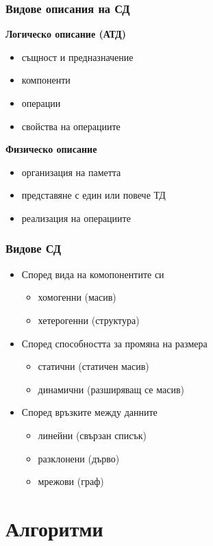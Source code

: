 \documentclass[alsotrans]{beamerswitch}
\begin{document}
\begin{frame}
  \frametitle{Видове описания на СД}

  \textbf{Логическо описание (АТД)}
  \begin{itemize}
  \item същност и предназначение
  \item компоненти
  \item операции
  \item свойства на операциите
  \end{itemize}
  \vspace{1em}
  \pause
  \textbf{Физическо описание}
  \begin{itemize}
  \item организация на паметта
  \item представяне с един или повече ТД
  \item реализация на операциите
  \end{itemize}
\end{frame}

\begin{frame}
  \frametitle{Видове СД}

  \begin{itemize}[<+->]
  \item Според вида на комопонентите си
    \begin{itemize}[<.->]
    \item хомогенни (масив)
    \item хетерогенни (структура)
    \end{itemize}
  \item Според способността за промяна на размера
    \begin{itemize}[<.->]
    \item статични (статичен масив)
    \item динамични (разширяващ се масив)
    \end{itemize}
  \item Според връзките между данните
    \begin{itemize}[<.->]
    \item линейни (свързан списък)
    \item разклонени (дърво)
    \item мрежови (граф)
    \end{itemize}
  \end{itemize}
\end{frame}

\section{Алгоритми}
\end{document}
